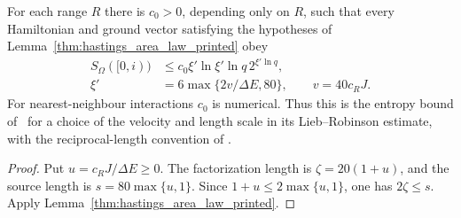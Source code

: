 \begin{theorem}
    \label{thm:hastings_area_law_source}
    \leanok
    For each range $R$ there is $c_0>0$, depending only on $R$, such that
    every Hamiltonian and ground vector satisfying the hypotheses of
    Lemma~\ref{thm:hastings_area_law_printed} obey
    \begin{align}
        S_\Omega([0,i)) & \le c_0\xi'\ln\xi'\ln q\,2^{\xi'\ln q},
        \label{eq:hastings_source_entropy_bound}
        \\
        \xi'            & =6\max\{2v/\Delta E,80\},\qquad v=40c_RJ.
        \label{eq:hastings_source_entropy_length}
    \end{align}
    For nearest-neighbour interactions $c_0$ is numerical. Thus this is the
    entropy bound of~\cite[lines 124--144]{Hastings2007AreaLaw} for a choice
    of the velocity and length scale in its Lieb--Robinson estimate, with
    the reciprocal-length convention of
    \cite{gap:hastings07_lemma1_decay_length}.
\end{theorem}
\begin{proof}\leanok
    Put $u=c_RJ/\Delta E\ge0$. The factorization length is
    $\zeta=20(1+u)$, and the source length is
    $s=80\max\{u,1\}$. Since $1+u\le2\max\{u,1\}$, one has
    $2\zeta\le s$. Apply Lemma~\ref{thm:hastings_area_law_printed}.
\end{proof}

